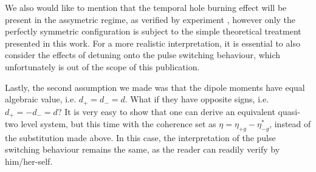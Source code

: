 \documentclass[preprint,secnumarabic,amssymb, nobibnotes, aip, prd]{revtex4-1}
\begin{document}
We also would like to mention that the temporal hole burning effect will be present in the assymetric regime, as verified by experiment \cite{burghoff2015evaluating}, however only the perfectly symmetric configuration is subject to the simple theoretical treatment presented in this work. For a more realistic interpretation, it is essential to also consider the effects of detuning onto the pulse switching behaviour, which unfortunately is out of the scope of this publication.

Lastly, the second assumption we made was that the dipole moments have equal algebraic value, i.e. $d_{+} = d_{-} = d$. What if they have opposite signs, i.e. $d_{+} = -d_{-} = d$? It is very easy to show that one can derive an equivalent quasi-two level system, but this time with the coherence set as $\eta = \eta_{+g}-\eta_{-g}^*$, instead of the substitution made above. In this case, the interpretation of the pulse switching behaviour remains the same, as the reader can readily verify by him/her-self.




	
	
	
	

\end{document}
